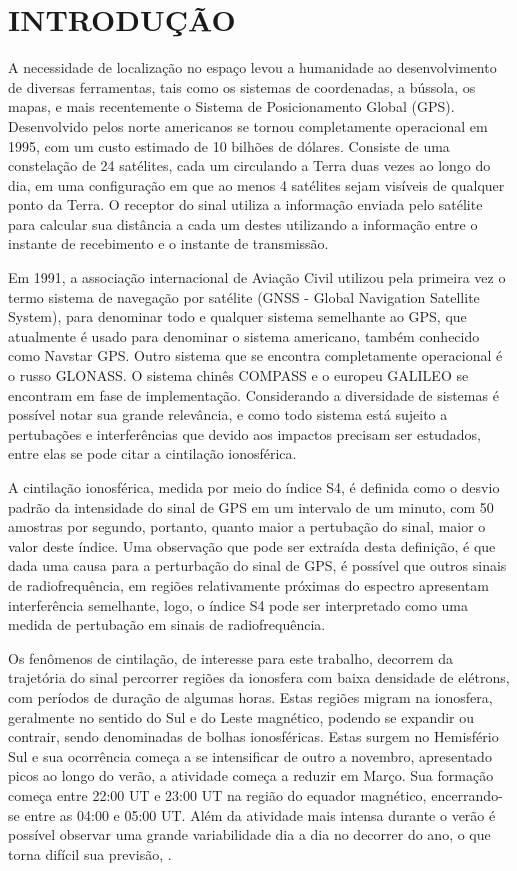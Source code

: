 \chapter{INTRODUÇÃO}

A necessidade de localização no espaço levou a humanidade ao desenvolvimento de diversas ferramentas, tais como os sistemas de coordenadas, a bússola, os mapas, e mais recentemente o Sistema de Posicionamento Global (GPS). Desenvolvido pelos norte americanos se tornou completamente operacional em 1995, com um custo estimado de 10 bilhões de dólares. Consiste de uma constelação de 24 satélites, cada um circulando a Terra duas vezes ao longo do dia, em uma configuração em que ao menos 4 satélites sejam visíveis de qualquer ponto da Terra. O receptor do sinal utiliza a informação enviada pelo satélite para calcular sua distância a cada um destes utilizando a informação entre o instante de recebimento e o instante de transmissão. 

Em 1991, a associação internacional de Aviação Civil utilizou pela primeira vez o termo sistema de navegação por satélite (GNSS - Global Navigation Satellite System), para denominar todo e qualquer sistema semelhante ao GPS, que atualmente é usado para denominar o sistema americano, também conhecido como Navstar GPS. Outro sistema que se encontra completamente operacional é o russo GLONASS. O sistema chinês COMPASS e o europeu GALILEO se encontram em fase de implementação. Considerando a diversidade de sistemas é possível notar sua grande relevância, e como todo sistema está sujeito a pertubações e interferências que devido aos impactos precisam ser estudados, entre elas se pode citar a cintilação ionosférica.

A cintilação ionosférica, medida por meio do índice S4, é definida como o desvio padrão da intensidade do sinal de GPS em um intervalo de um minuto, com 50 amostras por segundo, portanto, quanto maior a pertubação do sinal, maior o valor deste índice. Uma observação que pode ser extraída desta definição, é que dada uma causa para a perturbação do sinal de GPS, é possível que outros sinais de radiofrequência, em regiões relativamente próximas do espectro apresentam interferência semelhante, logo, o índice S4 pode ser interpretado como uma medida de pertubação em sinais de radiofrequência.

Os fenômenos de cintilação, de interesse para este trabalho, decorrem da trajetória do sinal percorrer regiões da ionosfera com baixa densidade de elétrons, com períodos de duração de algumas horas. Estas regiões migram na ionosfera, geralmente no sentido do Sul e do Leste magnético, podendo se expandir ou contrair, sendo denominadas de bolhas ionosféricas. Estas surgem no Hemisfério Sul e sua ocorrência começa a se intensificar de outro a novembro, apresentado picos ao longo do verão, a atividade começa a reduzir em Março. Sua formação começa entre 22:00 UT e 23:00 UT na região do equador magnético, encerrando-se entre as 04:00 e 05:00 UT. Além da atividade mais intensa durante o verão é possível observar uma grande variabilidade dia a dia no decorrer do ano, o que torna difícil sua previsão, \cite{TAKAHASHI:2006}.

